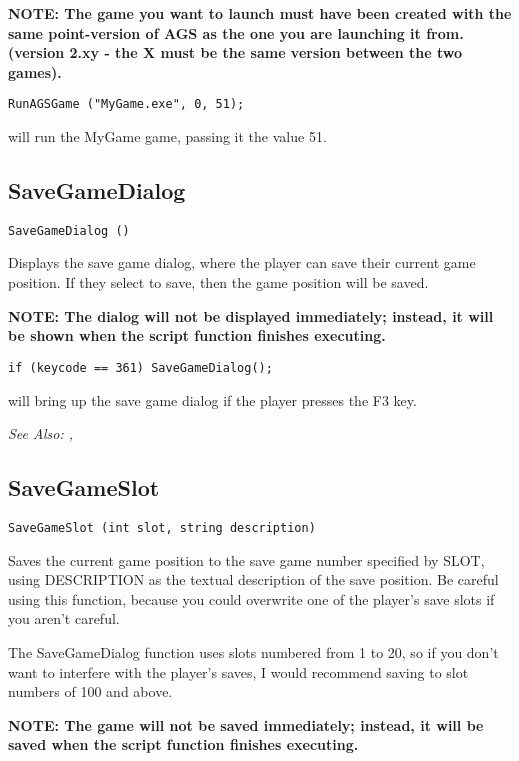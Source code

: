\bf{NOTE:} The game you want to launch must have been created with the same point-version
of AGS as the one you are launching it from. (version 2.xy - the X must be the same version
between the two games).

\begin{verbatim}
RunAGSGame ("MyGame.exe", 0, 51);
\end{verbatim}
will run the MyGame game, passing it the value 51.


\subsection{SaveGameDialog}\label{SaveGameDialog}%

\begin{verbatim}
SaveGameDialog ()
\end{verbatim}
Displays the save game dialog, where the player can save their current
game position. If they select to save, then the game position will be saved.

\bf{NOTE:} The dialog will not be displayed immediately; instead, it will be
shown when the script function finishes executing.

\begin{verbatim}
if (keycode == 361) SaveGameDialog();
\end{verbatim}
will bring up the save game dialog if the player presses the F3 key.

\it{See Also:} , 


\subsection{SaveGameSlot}\label{SaveGameSlot}%

\begin{verbatim}
SaveGameSlot (int slot, string description)
\end{verbatim}
Saves the current game position to the save game number specified by SLOT,
using DESCRIPTION as the textual description of the save position.
Be careful using this function, because you could overwrite one of the
player's save slots if you aren't careful.

The SaveGameDialog function uses slots numbered from 1 to 20, so if you
don't want to interfere with the player's saves, I would recommend saving
to slot numbers of 100 and above.

\bf{NOTE:} The game will not be saved immediately; instead, it will be
saved when the script function finishes executing.

